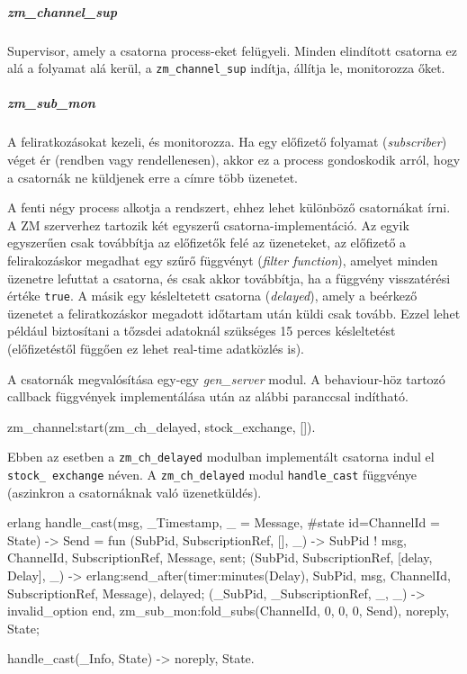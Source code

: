 \documentclass[12pt, a4paper, oneside]{book}
\begin{document}
\subparagraph{zm\_channel\_sup} Supervisor, amely a csatorna process-eket
felügyeli. Minden elindított csatorna ez alá a folyamat alá kerül, a
\texttt{zm\_channel\_sup} indítja, állítja le, monitorozza őket.

\subparagraph{zm\_sub\_mon} A feliratkozásokat kezeli, és monitorozza. Ha egy
előfizető folyamat (\emph{subscriber}) véget ér (rendben vagy rendellenesen),
akkor ez a process gondoskodik arról, hogy a csatornák ne küldjenek erre a
címre több üzenetet.

A fenti négy process alkotja a rendszert, ehhez lehet különböző csatornákat
írni. A ZM szerverhez tartozik két egyszerű csatorna-implementáció. Az egyik
egyszerűen csak továbbítja az előfizetők felé az üzeneteket, az előfizető a
felirakozáskor megadhat egy szűrő függvényt (\emph{filter function}), amelyet
minden üzenetre lefuttat a csatorna, és csak akkor továbbítja, ha a függvény
visszatérési értéke \texttt{true}. A másik egy késleltetett csatorna
(\emph{delayed}), amely a beérkező üzenetet a feliratkozáskor megadott
időtartam után küldi csak tovább. Ezzel lehet például biztosítani a tőzsdei
adatoknál szükséges 15 perces késleltetést (előfizetéstől függően ez lehet
real-time adatközlés is).

A csatornák megvalósítása egy-egy \emph{gen\_server} modul. A behaviour-höz
tartozó callback függvények implementálása után az alábbi paranccsal indítható.

\begin{code}{}{}
zm_channel:start(zm_ch_delayed, stock_exchange, []).
\end{code}

Ebben az esetben a \texttt{zm\_ch\_delayed} modulban implementált csatorna indul el
\texttt{stock\_ exchange} néven. A \texttt{zm\_ch\_delayed} modul \texttt{handle\_cast}
függvénye (aszinkron a csatornáknak való üzenetküldés). 

\begin{code}{erlang}{}
handle_cast({msg, {_Timestamp, _} = Message}, 
            #state{ id=ChannelId } = State) ->
  Send = fun
    ({SubPid, SubscriptionRef, []}, _) ->
      SubPid ! {msg, {ChannelId, SubscriptionRef}, Message},
      sent;
    ({SubPid, SubscriptionRef, [{delay, Delay}]}, _) ->
      erlang:send_after(timer:minutes(Delay), 
                        SubPid, 
                        {msg, {ChannelId, SubscriptionRef}, 
                        Message}),
      delayed;
    ({_SubPid, _SubscriptionRef, _}, _) ->
      invalid_option
  end,
  zm_sub_mon:fold_subs(ChannelId, {0, 0, 0}, Send),
  {noreply, State};

handle_cast(_Info, State) ->
  {noreply, State}.
\end{code}
\end{document}
